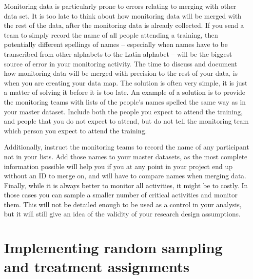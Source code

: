 Monitoring data is particularly prone to errors 
relating to merging with other data set. 
It is too late to think about how monitoring data will be merged
with the rest of the data, after the monitoring data is already collected.
If you send a team to simply record the name of all people attending a training,
then potentially different spellings of names 
-- especially when names have to be transcribed from other alphabets to the Latin alphabet --
will be the biggest source of error in your monitoring activity.
The time to discuss and document how monitoring data will be merged with precision
to the rest of your data, is when you are creating your data map.
The solution is often very simple, it is just a matter of solving it before it is too late.
An example of a solution is to provide the monitoring teams 
with lists of the people's names spelled the same way as in your master dataset. 
Include both the people you expect to attend the training,
and people that you do not expect to attend,
but do not tell the monitoring team which person you expect to attend the training.

Additionally, instruct the monitoring teams to record the name of any
participant not in your lists. 
Add those names to your master datasets, 
as the most complete information possible will help you 
if you at any point in your project end up without an ID to merge on,
and will have to compare names when merging data.
Finally, while it is always better to monitor all activities,
it might be to costly. 
In those cases you can sample a smaller number of critical activities and monitor them.
This will not be detailed enough to be used as a control in your analysis,
but it will still give an idea of the validity of your research design assumptions.


\section{Implementing random sampling and treatment assignments}

